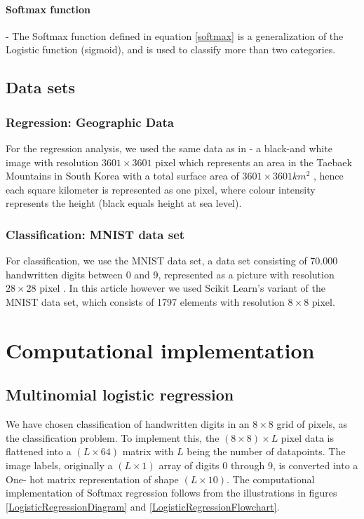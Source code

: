 \documentclass[11pt,a4paper,titlepage]{article}
\begin{document}
\paragraph*{Softmax function} - The Softmax function defined in equation \eqref{softmax} is a generalization of the Logistic function (sigmoid), and is used to classify more than two categories.
\subsection{Data sets}
\subsubsection{Regression: Geographic Data}
For the regression analysis, we used the same data as in \citep{Project1} - a black-and white image with resolution $3601 \times 3601$ pixel which represents an area in the Taebaek Mountains in South Korea with a total surface area of $3601 \times 3601km^2$ , hence each square kilometer is represented as one pixel, where colour intensity represents the height (black equals height at sea level).
\subsubsection{Classification: MNIST data set}
For classification, we use the MNIST data set, a data set consisting of 70.000 handwritten digits between 0 and 9, represented as a picture with resolution $28\times28$ pixel \citep{lecun2010mnist}. In this article however we used Scikit Learn's variant of the MNIST data set, which consists of 1797 elements with resolution $8\times8$ pixel. 
\section{Computational implementation}

\subsection{Multinomial logistic regression}
We have chosen classification of handwritten digits in an $8\times 8$ grid of pixels, as the classification problem. To implement this, the $(8\times 8)\times L$ pixel data is flattened into a $(L \times 64)$ matrix with $L$ being the number of datapoints. The image labels, originally a $(L \times 1)$ array of digits $0$ through $9$, is converted into a One- hot matrix representation of shape $(L \times 10)$. The computational implementation of Softmax regression follows from the illustrations in figures \ref{LogisticRegressionDiagram} and \ref{LogisticRegressionFlowchart}. 
\end{document}
